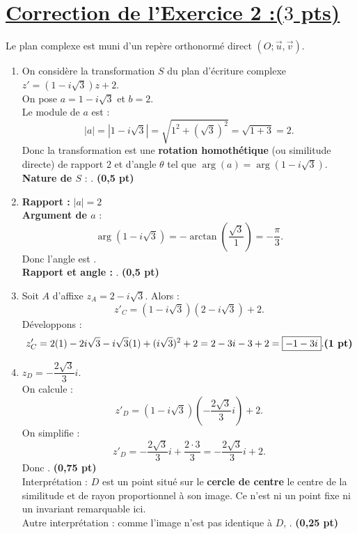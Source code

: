 \documentclass[12pt,a4paper]{article}
\begin{document}
\section*{\underline{Correction de l'Exercice 2 :($3$ pts)}}
Le plan complexe est muni d’un repère orthonormé direct \( (O ; \vec{u}, \vec{v}) \). 

\begin{enumerate}
    \item On considère la transformation \( S \) du plan d’écriture complexe \( z' = (1 - i\sqrt{3})z + 2 \).\\
    On pose \( a = 1 - i\sqrt{3} \) et \( b = 2 \).\\
    Le module de \( a \) est : 
    \[
    |a| = |1 - i\sqrt{3}| = \sqrt{1^2 + (\sqrt{3})^2} = \sqrt{1 + 3} = 2.
    \]
    Donc la transformation est une \textbf{rotation homothétique} (ou similitude directe) de rapport \( 2 \) et d’angle \( \theta \) tel que \( \arg(a) = \arg(1 - i\sqrt{3}) \).\\
    \textbf{Nature de \( S \)} : . \hfill \textbf{(0,5 pt)}
    
    \item \textbf{Rapport :} \( |a| = 2 \)\\
    \textbf{Argument de \( a \)} :
    \[
    \arg(1 - i\sqrt{3}) = -\arctan\left( \dfrac{\sqrt{3}}{1} \right) = -\dfrac{\pi}{3}.
    \]
    Donc l’angle est .\\
    \textbf{Rapport et angle :} . \hfill \textbf{(0,5 pt)}

    \item Soit \( A \) d’affixe \( z_A = 2 - i\sqrt{3} \). Alors :
    \[
    z'_C = (1 - i\sqrt{3})(2 - i\sqrt{3}) + 2.
    \]
    Développons :
    \[
    z'_C = 2(1) - 2i\sqrt{3} - i\sqrt{3}(1) + (i\sqrt{3})^2 + 2 = 2 - 3i - 3 + 2 = \boxed{-1 - 3i}. \hfill \textbf{(1 pt)}
    \]

    \item \( z_D = -\dfrac{2\sqrt{3}}{3}i \).\\
    On calcule :
    \[
    z'_D = (1 - i\sqrt{3}) \left(-\dfrac{2\sqrt{3}}{3}i \right) + 2.
    \]
    On simplifie :
    \[
    z'_D = -\dfrac{2\sqrt{3}}{3}i + \dfrac{2\cdot 3}{3} = -\dfrac{2\sqrt{3}}{3}i + 2.
    \]
    Donc . \hfill \textbf{(0,75 pt)}\\
    Interprétation : \( D \) est un point situé sur le \textbf{cercle de centre} le centre de la similitude et de rayon proportionnel à son image. Ce n’est ni un point fixe ni un invariant remarquable ici.\\
    Autre interprétation : comme l’image n’est pas identique à \( D \), . \hfill \textbf{(0,25 pt)}
\end{enumerate}
\end{document}
